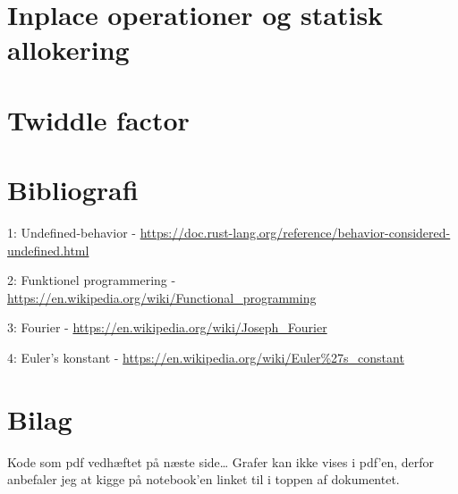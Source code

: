 \documentclass[11pt,a4paper]{article}
\begin{document}
\section{Inplace operationer og statisk allokering}
\label{sec:org849c817}

\section{Twiddle factor}
\label{sec:org14eb315}

\section{Bibliografi}
\label{sec:orgf65bb26}

1: Undefined-behavior - \url{https://doc.rust-lang.org/reference/behavior-considered-undefined.html}

2: Funktionel programmering - \url{https://en.wikipedia.org/wiki/Functional\_programming}

3: Fourier - \url{https://en.wikipedia.org/wiki/Joseph\_Fourier}

4: Euler's konstant - \url{https://en.wikipedia.org/wiki/Euler\%27s\_constant}


\section{Bilag}
\label{sec:org6531fa8}

Kode som pdf vedhæftet på næste side\ldots{}
Grafer kan ikke vises i pdf'en, derfor anbefaler jeg at kigge på notebook'en linket til i toppen af dokumentet.


\end{document}

